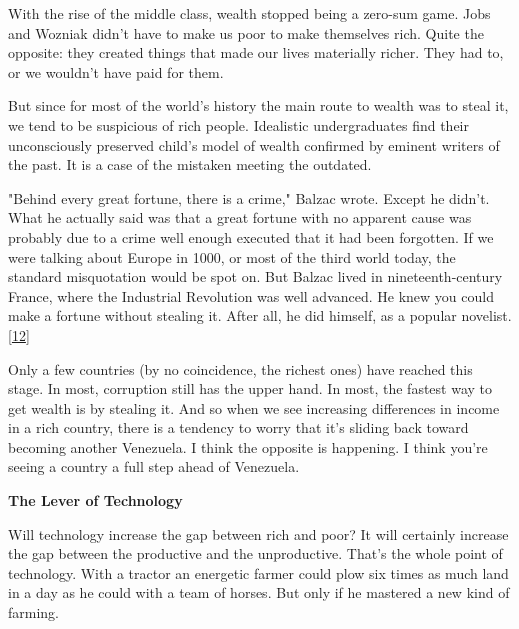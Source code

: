 With
                  the rise of the middle class, wealth stopped being a zero-sum
                  game. Jobs and Wozniak didn't have to make us poor to make
                  themselves rich. Quite the opposite: they created things that
                  made our lives materially richer. They had to, or we wouldn't
                  have paid for them.

But since for most of the
                  world's history the main route to wealth was to steal it, we
                  tend to be suspicious of rich people. Idealistic
                  undergraduates find their unconsciously preserved child's
                  model of wealth confirmed by eminent writers of the past. It
                  is a case of the mistaken meeting the outdated.

"Behind
                  every great fortune, there is a crime," Balzac wrote. Except
                  he didn't. What he actually said was that a great fortune with
                  no apparent cause was probably due to a crime well enough
                  executed that it had been forgotten. If we were talking about
                  Europe in 1000, or most of the third world today, the standard
                  misquotation would be spot on. But Balzac lived in
                  nineteenth-century France, where the Industrial Revolution was
                  well advanced. He knew you could make a fortune without
                  stealing it. After all, he did himself, as a popular novelist.
                  [\href{\#f12n}{12}]

Only a few countries (by no coincidence, the
                  richest ones) have reached this stage. In most, corruption
                  still has the upper hand. In most, the fastest way to get
                  wealth is by stealing it. And so when we see increasing
                  differences in income in a rich country, there is a tendency
                  to worry that it's sliding back toward becoming another
                  Venezuela. I think the opposite is happening. I think you're
                  seeing a country a full step ahead of Venezuela.

\textbf{The Lever of Technology}

Will technology increase the gap between rich and
                  poor? It will certainly increase the gap between the
                  productive and the unproductive. That's the whole point of
                  technology. With a tractor an energetic farmer could plow six
                  times as much land in a day as he could with a team of horses.
                  But only if he mastered a new kind of farming.

